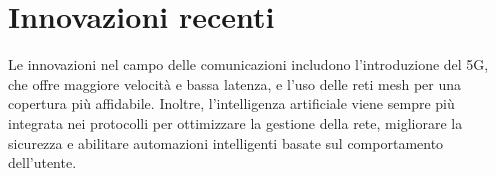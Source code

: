 \section{Innovazioni recenti}
Le innovazioni nel campo delle comunicazioni includono l’introduzione del 5G, che offre maggiore velocità e bassa latenza, e l’uso delle reti mesh per una copertura più affidabile. Inoltre, l’intelligenza artificiale viene sempre più integrata nei protocolli per ottimizzare la gestione della rete, migliorare la sicurezza e abilitare automazioni intelligenti basate sul comportamento dell’utente.

